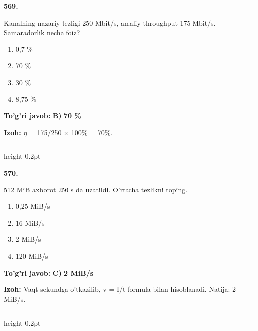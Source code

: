\documentclass[10pt,a4paper,oneside]{article}
\begin{document}
\noindent\textbf{\color{ink}569.}
\par
Kanalning nazariy tezligi 250 Mbit/s, amaliy throughput 175 Mbit/s. Samaradorlik necha foiz?
\begin{enumerate}[label=\Alph*),leftmargin=9mm]
\item 0,7 \%
\item 70 \%
\item 30 \%
\item 8,75 \%
\end{enumerate}
\begin{tcolorbox}[enhanced,breakable,colback=teal!4,colframe=teal!50!black,boxrule=0.5pt,arc=1.1mm,left=3mm,right=3mm,top=1.7mm,bottom=1.7mm,before skip=2mm,after skip=2mm]
\textbf{\color{teal}To'g'ri javob:} \textbf{B) 70 \%}
\par\smallskip
\textbf{Izoh:} \ensuremath{\eta} = 175/250 \ensuremath{\times} 100\% = 70\%.
\end{tcolorbox}
\vspace{2mm}\hrule height 0.2pt \vspace{3mm}

\noindent\textbf{\color{ink}570.}
\par
512 MiB axborot 256 s da uzatildi. O'rtacha tezlikni toping.
\begin{enumerate}[label=\Alph*),leftmargin=9mm]
\item 0,25 MiB/s
\item 16 MiB/s
\item 2 MiB/s
\item 120 MiB/s
\end{enumerate}
\begin{tcolorbox}[enhanced,breakable,colback=teal!4,colframe=teal!50!black,boxrule=0.5pt,arc=1.1mm,left=3mm,right=3mm,top=1.7mm,bottom=1.7mm,before skip=2mm,after skip=2mm]
\textbf{\color{teal}To'g'ri javob:} \textbf{C) 2 MiB/s}
\par\smallskip
\textbf{Izoh:} Vaqt sekundga o'tkazilib, v = I/t formula bilan hisoblanadi. Natija: 2 MiB/s.
\end{tcolorbox}
\vspace{2mm}\hrule height 0.2pt \vspace{3mm}
\end{document}
